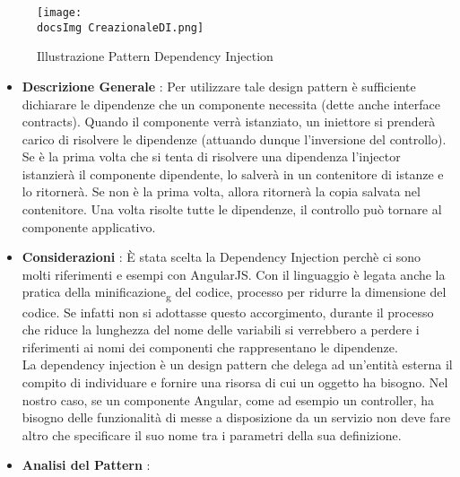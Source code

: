 {{{			\begin{figure}[H]
				\centering
				\texttt{[image: \\docsImg CreazionaleDI.png]}
				\caption{Illustrazione Pattern Dependency Injection}
				\label{Illustrazione Pattern Dependency Injection}
			\end{figure}
		
			\begin{itemize}\itemsep1pt
				\item \textbf{Descrizione Generale} : Per utilizzare tale design pattern è sufficiente dichiarare le dipendenze che un componente necessita (dette anche interface contracts). Quando il componente verrà istanziato, un iniettore si prenderà carico di risolvere le dipendenze (attuando dunque l'inversione del controllo). Se è la prima volta che si tenta di risolvere una dipendenza l'injector istanzierà il componente dipendente, lo salverà in un contenitore di istanze e lo ritornerà. Se non è la prima volta, allora ritornerà la copia salvata nel contenitore. Una volta risolte tutte le dipendenze, il controllo può tornare al componente applicativo.
				\item \textbf{Considerazioni} : È stata scelta la Dependency Injection perchè ci sono molti riferimenti e esempi con AngularJS. Con il linguaggio è legata anche la pratica della minificazione\textsubscript{g} del codice, processo per ridurre la dimensione del codice. Se infatti non si adottasse questo accorgimento, durante il processo che riduce la lunghezza del nome delle variabili si verrebbero a perdere i riferimenti ai nomi dei componenti che rappresentano le dipendenze.\\
				La dependency injection è un design pattern che delega ad un’entità esterna il compito di individuare e fornire una risorsa di cui un oggetto ha bisogno. Nel nostro caso, se un componente Angular, come ad esempio un controller, ha bisogno delle funzionalità di messe a disposizione da un servizio non deve fare altro che specificare il suo nome tra i parametri della sua definizione.
				\item \textbf{Analisi del Pattern} : \hfill
				

\end{itemize}}}}
